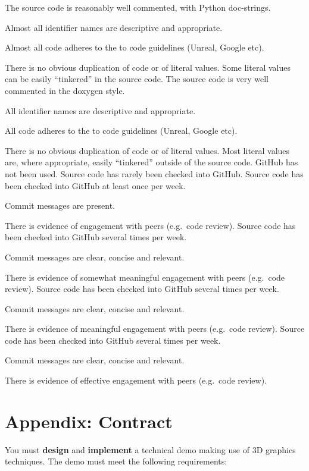 \documentclass{../../fal_assignment}
\begin{document}
\begin{markingrubric}
\grade The source code is reasonably well commented, with Python doc-strings.
\par Almost all identifier names are descriptive and appropriate.
\par Almost all code adheres to the to code guidelines (Unreal, Google etc).
\par There is no obvious duplication of code or of literal values. Some literal values can be easily ``tinkered'' in the source code. 
\grade The source code is very well commented in the doxygen style.
\par All identifier names are descriptive and appropriate.
\par All code adheres to the to code guidelines (Unreal, Google etc).
\par There is no obvious duplication of code or of literal values. Most literal values are, where appropriate, easily ``tinkered'' outside of the source code.  	
		\grade\fail GitHub has not been used.
		\grade Source code has rarely been checked into GitHub.
		\grade Source code  has been checked into GitHub at least once per week.
			\par Commit messages are present.
			\par There is evidence of engagement with peers (e.g.\ code review).
		\grade Source code  has been checked into GitHub several times per week.
			\par Commit messages are clear, concise and relevant.
			\par There is evidence of somewhat meaningful engagement with peers (e.g.\ code review).
		\grade Source code has been checked into GitHub several times per week.
			\par Commit messages are clear, concise and relevant.
			\par There is evidence of meaningful engagement with peers (e.g.\ code review).
		\grade Source code has been checked into GitHub several times per week.
			\par Commit messages are clear, concise and relevant.
			\par There is evidence of effective engagement with peers (e.g.\ code review).
\end{markingrubric}

\section*{Appendix: Contract}

You must \textbf{design} and \textbf{implement} a technical demo making use of 3D graphics techniques.
The demo must meet the following requirements:
\end{document}
